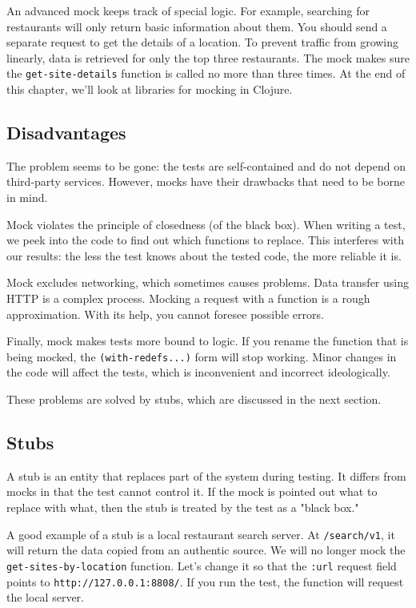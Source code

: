 An advanced mock keeps track of special logic. For example, searching for restaurants will only return basic information about them. You should send a separate request to get the details of a location. To prevent traffic from growing linearly, data is retrieved for only the top three restaurants. The mock makes sure the \verb|get-site-details| function is called no more than three times. At the end of this chapter, we'll look at libraries for mocking in Clojure.

\subsection{Disadvantages}

The problem seems to be gone: the tests are self-contained and do not depend on third-party services. However, mocks have their drawbacks that need to be borne in mind.

Mock violates the principle of closedness (of the black box). When writing a test, we peek into the code to find out which functions to replace. This interferes with our results: the less the test knows about the tested code, the more reliable it is.

Mock excludes networking, which sometimes causes problems. Data transfer using HTTP is a complex process. Mocking a request with a function is a rough approximation. With its help, you cannot foresee possible errors.

Finally, mock makes tests more bound to logic. If you rename the function that is being mocked, the \verb|(with-redefs...)| form will stop working. Minor changes in the code will affect the tests, which is inconvenient and incorrect ideologically.

These problems are solved by stubs, which are discussed in the next section.

\subsection{Stubs}


A stub is an entity that replaces part of the system during testing. It differs from mocks in that the test cannot control it. If the mock is pointed out what to replace with what, then the stub is treated by the test as a "black box."

A good example of a stub is a local restaurant search server. At \verb|/search/v1|, it will return the data copied from an authentic source. We will no longer mock the \verb|get-sites-by-location| function. Let's change it so that the \verb|:url| request field points to \verb|http://127.0.0.1:8808/|. If you run the test, the function will request the local server.

